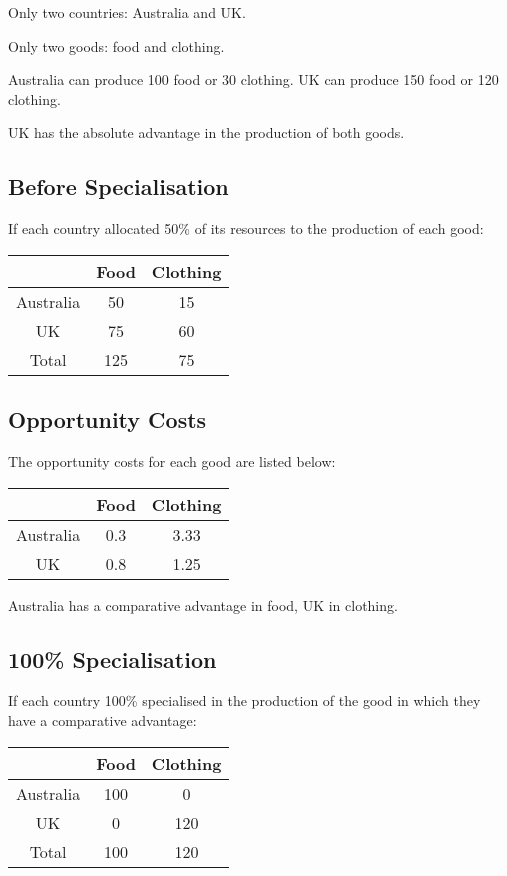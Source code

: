 \documentclass[a4paper,11pt]{article}
\begin{document}
Only two countries: Australia and UK.

Only two goods: food and clothing.

Australia can produce 100 food or 30 clothing. UK can produce 150 food or 120
clothing.

UK has the absolute advantage in the production of both goods.


\subsection{Before Specialisation}

If each country allocated 50\% of its resources to the production of each good:

\begin{center}
\begin{tabular}{c|c|c}
& Food & Clothing \\
\hline
Australia & 50  & 15 \\
UK        & 75  & 60 \\
Total     & 125 & 75 \\
\end{tabular}
\end{center}


\subsection{Opportunity Costs}

The opportunity costs for each good are listed below:

\begin{center}
\begin{tabular}{c|c|c}
& Food & Clothing \\
\hline
Australia & 0.3 & 3.33 \\
UK        & 0.8 & 1.25 \\
\end{tabular}
\end{center}

Australia has a comparative advantage in food, UK in clothing.


\subsection{100\% Specialisation}

If each country 100\% specialised in the production of the good in which they
have a comparative advantage:

\begin{center}
\begin{tabular}{c|c|c}
& Food & Clothing \\
\hline
Australia & 100 & 0   \\
UK        & 0   & 120 \\
Total     & 100 & 120 \\
\end{tabular}
\end{center}
\end{document}
